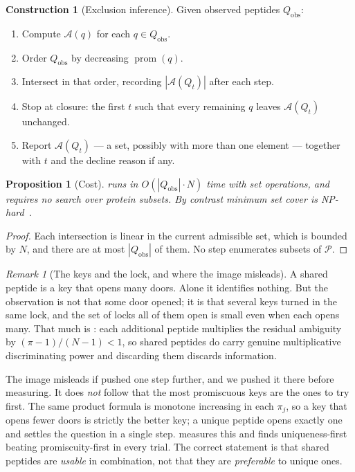 \documentclass[11pt,a4paper]{article}
\newtheorem{proposition}[theorem]{Proposition}
\theoremstyle{definition}
\newtheorem{construction}[theorem]{Construction}
\theoremstyle{remark}
\newtheorem{remark}[theorem]{Remark}
\newcommand{\Prot}{\mathcal{P}}              %
\newcommand{\amb}{\mathcal{A}}               %
\DeclareMathOperator{\prom}{prom}
\begin{document}
\begin{construction}[Exclusion inference]
\label{con:inference}
Given observed peptides $Q_{\mathrm{obs}}$:
\begin{enumerate}[leftmargin=2.0em,itemsep=1pt]
  \item Compute $\amb(q)$ for each $q\in Q_{\mathrm{obs}}$.
  \item Order $Q_{\mathrm{obs}}$ by decreasing $\prom(q)$.
  \item Intersect in that order, recording $|\amb(Q_t)|$ after each step.
  \item Stop at closure: the first $t$ such that every remaining
  $q$ leaves $\amb(Q_t)$ unchanged.
  \item Report $\amb(Q_t)$ --- a set, possibly with more than one
  element --- together with $t$ and the decline reason if any.
\end{enumerate}
\end{construction}

\begin{proposition}[Cost]
\label{prop:cost}
 runs in $O(|Q_{\mathrm{obs}}|\cdot N)$ time with set
operations, and requires no search over protein subsets. By contrast
minimum set cover is
NP-hard~\citep{karp1972reducibility,garey1979computers}.
\end{proposition}

\begin{proof}
Each intersection is linear in the current admissible set, which is
bounded by $N$, and there are at most $|Q_{\mathrm{obs}}|$ of them.
No step enumerates subsets of $\Prot$.
\end{proof}

\begin{remark}[The keys and the lock, and where the image misleads]
\label{rem:keys}
A shared peptide is a key that opens many doors. Alone it identifies
nothing. But the observation is not that some door opened; it is that
several keys turned in the same lock, and the set of locks all of them
open is small even when each opens many. That much is
: each additional peptide multiplies the residual
ambiguity by $(\pi-1)/(N-1)<1$, so shared peptides do carry genuine
multiplicative discriminating power and discarding them discards
information.

The image misleads if pushed one step further, and we pushed it there
before measuring. It does \emph{not} follow that the most promiscuous
keys are the ones to try first. The same product formula is monotone
increasing in each $\pi_j$, so a key that opens fewer doors is strictly
the better key; a unique peptide opens exactly one and settles the
question in a single step.  measures this and finds
uniqueness-first beating promiscuity-first in every trial. The correct
statement is that shared peptides are \emph{usable} in combination, not
that they are \emph{preferable} to unique ones.
\end{remark}
\end{document}
